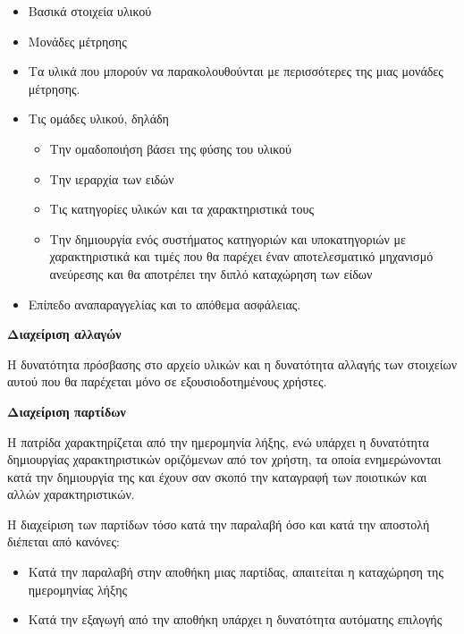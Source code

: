 \begin{itemize}
    \item Βασικά στοιχεία υλικού
    \item Μονάδες μέτρησης
    \item Τα υλικά που μπορούν να παρακολουθούνται με περισσότερες της μιας μονάδες μέτρησης.
    \item Τις ομάδες υλικού, δηλάδη
        \begin{itemize}
            \item Την ομαδοποιήση βάσει της φύσης του υλικού
            \item Την ιεραρχία των ειδών
            \item Τις κατηγορίες υλικών και τα χαρακτηριστικά τους
            \item Την δημιουργία ενός συστήματος κατηγοριών και υποκατηγοριών με χαρακτηριστικά και τιμές που θα παρέχει έναν αποτελεσματικό μηχανισμό ανεύρεσης και θα αποτρέπει την διπλό καταχώρηση των είδων
        \end{itemize}
    \item Επίπεδο αναπαραγγελίας και το απόθεμα ασφάλειας.
\end{itemize}

\begin{problem}
    \textbf{Διαχείριση αλλαγών}
\end{problem}

Η δυνατότητα πρόσβασης στο αρχείο υλικών και η δυνατότητα αλλαγής των στοιχείων αυτού που θα παρέχεται μόνο σε εξουσιοδοτημένους χρήστες.

\begin{problem}
    \textbf{Διαχείριση παρτίδων}
\end{problem}

Η πατρίδα χαρακτηρίζεται από την ημερομηνία λήξης, ενώ υπάρχει η δυνατότητα δημιουργίας χαρακτηριστικών οριζόμενων από τον χρήστη, τα οποία ενημερώνονται κατά την δημιουργία της και έχουν σαν σκοπό την καταγραφή των ποιοτικών και αλλών χαρακτηριστικών. \par
Η διαχείριση των παρτίδων τόσο κατά την παραλαβή όσο και κατά την αποστολή διέπεται από κανόνες:

\begin{itemize}
    \item Κατά την παραλαβή στην αποθήκη μιας παρτίδας, απαιτείται η καταχώρηση της ημερομηνίας λήξης
    \item Κατά την εξαγωγή από την αποθήκη υπάρχει η δυνατότητα αυτόματης επιλογής
\end{itemize}

